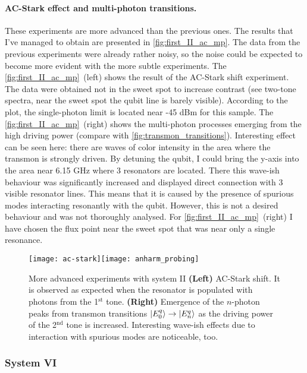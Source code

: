 \documentclass[12pt, twoside]{report}
\DeclarePairedDelimiter\ket{\lvert}{\rangle}
\numberwithin{equation}{section}
\begin{document}
\paragraph{AC-Stark effect and multi-photon transitions.} These experiments are more advanced than the previous ones. The results that I've managed to obtain are presented in \autoref{fig:first_II_ac_mp}. The data from the previous experiments were already rather noisy, so the noise could be expected to become more evident with the more subtle experiments. The \autoref{fig:first_II_ac_mp}~(left) shows the result of the AC-Stark shift experiment. The data were obtained not in the sweet spot to increase contrast (see two-tone spectra, near the sweet spot the qubit line is barely visible). According to the plot, the single-photon limit is located near -45 dBm for this sample. The \autoref{fig:first_II_ac_mp}~(right) shows the multi-photon processes emerging from the high driving power (compare with \autoref{fig:transmon_transitions}). Interesting effect can be seen here: there are waves of color intensity in the area where the transmon is strongly driven. By detuning the qubit, I could bring the y-axis into the area near 6.15 GHz where 3 resonators are located. There this wave-ish behaviour was significantly increased and displayed direct connection with 3 visible resonator lines. This means that it is caused by the presence of spurious modes interacting resonantly with the qubit. However, this is not a desired behaviour and was not thoroughly analysed. For \autoref{fig:first_II_ac_mp}~(right) I have chosen the flux point near the sweet spot that was near only a single resonance.


\begin{figure}
\texttt{[image: ac-stark]}\texttt{[image: anharm\_probing]}
\caption{More advanced experiments with system II \textbf{(Left)} AC-Stark shift. It is observed as expected when the resonator is populated with photons from the 1$^\text{st}$ tone. \textbf{(Right)} Emergence of the $n$-photon peaks from transmon transitions $\ket{E_0^q}\rightarrow\ket{E_n^q}$ as the driving power of the 2$^\text{nd}$ tone is increased. Interesting wave-ish effects due to interaction with spurious modes are noticeable, too.}
\label{fig:first_II_ac_mp}
\end{figure}

\subsubsection{System VI}
\end{document}
